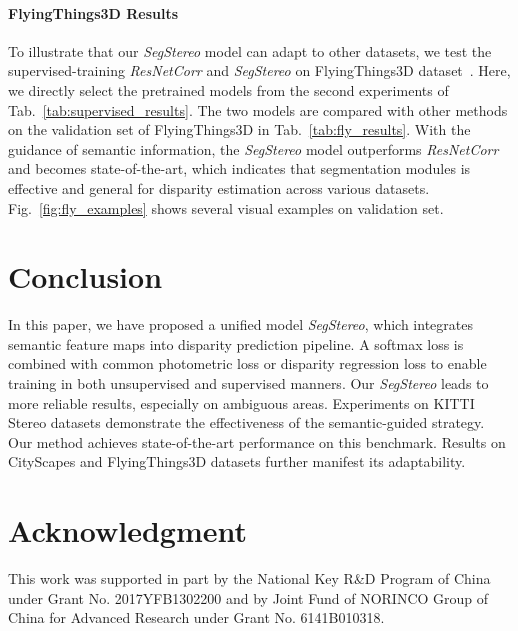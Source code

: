 \documentclass[runningheads]{llncs}
\begin{document}
\begin{table}[t]
  \centering
  \caption{Comparison with other disparity estimation methods on the test set of FlyingThings3D~\cite{mayer2016large}.}
  \label{tab:fly_results}
\end{table}

\paragraph{\textbf{FlyingThings3D Results }} To illustrate that our \emph{SegStereo} model can adapt to other datasets, we test the supervised-training \emph{ResNetCorr} and \emph{SegStereo} on FlyingThings3D dataset~\cite{mayer2016large}. Here, we directly select the pretrained models from the second experiments of Tab.~\ref{tab:supervised_results}. The two models are compared with other methods on the validation set of FlyingThings3D in Tab.~\ref{tab:fly_results}. With the guidance of semantic information, the \emph{SegStereo} model outperforms \emph{ResNetCorr} and becomes state-of-the-art, which indicates that segmentation modules is effective and general for disparity estimation across various datasets. Fig.~\ref{fig:fly_examples} shows several visual examples on validation set. 

\section{Conclusion}

In this paper, we have proposed a unified model \emph{SegStereo}, which integrates semantic feature maps into disparity prediction pipeline. A softmax loss is combined with common photometric loss or disparity regression loss to enable training in both unsupervised and supervised manners. Our \emph{SegStereo} leads to more reliable results, especially on ambiguous areas. Experiments on KITTI Stereo datasets demonstrate the effectiveness of the semantic-guided strategy. Our method achieves state-of-the-art performance on this benchmark. Results on CityScapes and FlyingThings3D datasets further manifest its adaptability.

\section*{Acknowledgment}

This work was supported in part by the National Key R\&D Program of China under Grant No. 2017YFB1302200 and by Joint Fund of NORINCO Group of China for Advanced Research under Grant No. 6141B010318.

\clearpage



\end{document}
